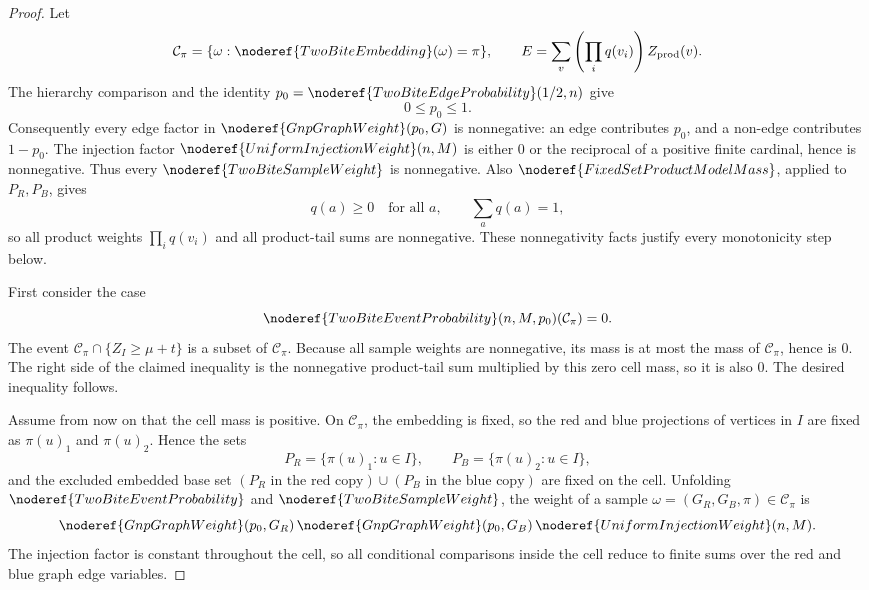 \begin{proof}
Let
\[
\mathcal C_\pi
=\{\omega:\noderef{TwoBiteEmbedding}(\omega)=\pi\},
\qquad
E=\sum_v\left(\prod_iq(v_i)\right)Z_{\mathrm{prod}}(v).
\]
The hierarchy comparison and the identity
\(p_0=\noderef{TwoBiteEdgeProbability}(1/2,n)\) give
\[
0\le p_0\le1.
\]
Consequently every edge factor in \(\noderef{GnpGraphWeight}(p_0,G)\) is
nonnegative: an edge contributes \(p_0\), and a non-edge contributes
\(1-p_0\).  The injection factor
\(\noderef{UniformInjectionWeight}(n,M)\) is either \(0\) or the reciprocal of
a positive finite cardinal, hence is nonnegative.  Thus every
\(\noderef{TwoBiteSampleWeight}\) is nonnegative.  Also
\(\noderef{FixedSetProductModelMass}\), applied to \(P_R,P_B\), gives
\[
q(a)\ge0\quad\text{for all }a,\qquad \sum_a q(a)=1,
\]
so all product weights \(\prod_iq(v_i)\) and all product-tail sums are
nonnegative.  These nonnegativity facts justify every monotonicity step below.

First consider the case
\[
\noderef{TwoBiteEventProbability}(n,M,p_0)(\mathcal C_\pi)=0.
\]
The event
\(\mathcal C_\pi\cap\{Z_I\ge\mu+t\}\) is a subset of \(\mathcal C_\pi\).
Because all sample weights are nonnegative, its mass is at most the mass of
\(\mathcal C_\pi\), hence is \(0\).  The right side of the claimed inequality
is the nonnegative product-tail sum multiplied by this zero cell mass, so it
is also \(0\).  The desired inequality follows.

Assume from now on that the cell mass is positive.  On \(\mathcal C_\pi\), the
embedding is fixed, so the red and blue projections of vertices in \(I\) are
fixed as \(\pi(u)_1\) and \(\pi(u)_2\).  Hence the sets
\[
P_R=\{\pi(u)_1:u\in I\},\qquad P_B=\{\pi(u)_2:u\in I\},
\]
and the excluded embedded base set
\((P_R\text{ in the red copy})\cup(P_B\text{ in the blue copy})\)
are fixed on the cell.  Unfolding
\(\noderef{TwoBiteEventProbability}\) and \(\noderef{TwoBiteSampleWeight}\),
the weight of a sample \(\omega=(G_R,G_B,\pi)\in\mathcal C_\pi\) is
\[
\noderef{GnpGraphWeight}(p_0,G_R)\,
\noderef{GnpGraphWeight}(p_0,G_B)\,
\noderef{UniformInjectionWeight}(n,M).
\]
The injection factor is constant throughout the cell, so all conditional
comparisons inside the cell reduce to finite sums over the red and blue graph
edge variables.


\end{proof}
